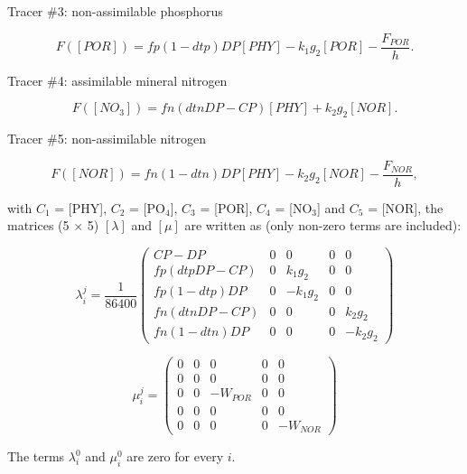 Tracer $\#$3: non-assimilable phosphorus

\begin{equation}
  F([POR]) = fp(1-dtp) DP [PHY] - k_1 g_2 [POR] - \frac{F_{POR}}{h}.
\end{equation}

Tracer $\#$4: assimilable mineral nitrogen

\begin{equation}
  F([NO_3]) = fn (dtn DP - CP) [PHY] + k_2 g_2 [NOR].
\end{equation}

Tracer $\#$5: non-assimilable nitrogen

\begin{equation}
  F([NOR]) = fn (1- dtn) DP [PHY] - k_2 g_2 [NOR] - \frac{F_{NOR}}{h},
\end{equation}

with $C_1$ = [PHY], $C_2$ = [PO$_4$], $C_3$ = [POR], $C_4$ = [NO$_3$] and $C_5$ = [NOR],
the matrices (5 $\times$ 5) $[\lambda]$ and $[\mu]$
are written as (only non-zero terms are included):

\begin{equation}
\lambda_i^j = \frac{1}{86400}
\left(
  \begin{array}{ccccc}
    CP-DP & 0 & 0 & 0 & 0 \\ %
    fp (dtp DP -CP) & 0 &  k_1 g_2 & 0 & 0 \\ %
    fp (1-dtp) DP   & 0 & -k_1 g_2 & 0 & 0 \\ %
    fn (dtn DP -CP) & 0 &        0 & 0 &  k_2 g_2 \\ %
    fn (1-dtn) DP   & 0 &        0 & 0 & -k_2 g_2
  \end{array}
\right)
\end{equation}

$$
  \mu_i^j =
  \begin{pmatrix}
   0 & 0 & 0 & 0 &  0 \\
   0 & 0 & 0 & 0 &  0 \\
   0 & 0 & -W_{POR} & 0 & 0 \\
   0 & 0 & 0 & 0 &  0 \\
   0 & 0 & 0 & 0 & -W_{NOR}
  \end{pmatrix}
$$

The terms $\lambda_i^0$ and $\mu_i^0$ are zero for every $i$.\\

